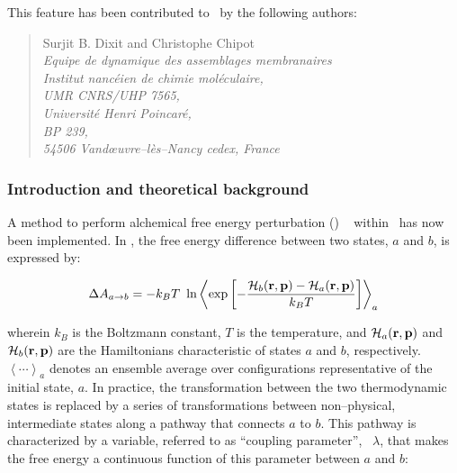 This feature has been contributed to \NAMD\ by the following authors:

\begin{quote}
   Surjit B. Dixit and Christophe Chipot          \\[0.4cm]
   {\it Equipe de dynamique des assemblages membranaires }\\
   {\it Institut nanc\'eien de chimie mol\'eculaire,  }\\
   {\it UMR CNRS/UHP 7565,                            }\\
   {\it Universit\'e Henri Poincar\'e,                }\\
   {\it BP 239,                                       }\\
   {\it 54506 Vand\oe uvre--l\`es--Nancy cedex, France}
\end{quote}



\subsubsection{Introduction and theoretical background}


A method to perform alchemical free energy perturbation (\FEP)
~\cite{zwan_54_1,Beveridge.89,Gunsteren.89,Straatsma.92,Kollman.93,Gilson.97,
Mark.98,chip_01_1} within \NAMD\ has now been implemented. 
In \FEP, the free energy difference between two states,
$a$ and $b$, is expressed by:

\begin{equation}
\label{master}
\Delta A_{a \rightarrow b} = -k_B T \ \ln
\left< \exp\left[-\frac{{\cal H}_b({\bf r}, {\bf p}) - 
                         {\cal H}_a({\bf r}, {\bf p})}
                        {k_B T}\right]
\right>_a
\end{equation}

wherein $k_B$ is the Boltzmann constant, $T$ is the temperature,
and ${\cal H}_a({\bf r}, {\bf p})$ and ${\cal H}_b({\bf r}, {\bf p})$
are the Hamiltonians characteristic of states $a$ and $b$, respectively.
$\left< \cdots \right>_a$ denotes an ensemble average over configurations
representative of the initial state, $a$.
In practice, the transformation between the two thermodynamic states
is replaced by a series of transformations between non--physical,
intermediate states along a pathway that connects $a$ to $b$.
This pathway is characterized by a variable, referred to as
``coupling parameter'',~\cite{Beveridge.89,Mark.98,king_93_1} 
$\lambda$, that makes the free energy
a continuous function of this parameter between $a$ and $b$:

